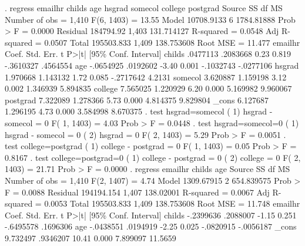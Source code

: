 . regress emailhr childs age hsgrad somecol college postgrad 
{\smallskip}
      Source {\VBAR}       SS           df       MS      Number of obs   =     1,410
   F(6, 1403)      =     13.55
       Model {\VBAR}  10708.9133         6  1784.81888   Prob > F        =    0.0000
    Residual {\VBAR}   184794.92     1,403  131.714127   R-squared       =    0.0548
   Adj R-squared   =    0.0507
       Total {\VBAR}  195503.833     1,409  138.753608   Root MSE        =    11.477
{\smallskip}
     emailhr {\VBAR}      Coef.   Std. Err.      t    P>|t|     [95\% Conf. Interval]
      childs {\VBAR}   .0477113   .2083668     0.23   0.819    -.3610327    .4564554
         age {\VBAR}  -.0654925   .0192602    -3.40   0.001    -.1032743   -.0277106
      hsgrad {\VBAR}   1.970668   1.143132     1.72   0.085    -.2717642      4.2131
     somecol {\VBAR}   3.620887   1.159198     3.12   0.002     1.346939    5.894835
     college {\VBAR}   7.565025   1.220929     6.20   0.000     5.169982    9.960067
    postgrad {\VBAR}   7.322089   1.278366     5.73   0.000     4.814375    9.829804
       _cons {\VBAR}   6.127687   1.296195     4.73   0.000     3.584998    8.670375
{\smallskip}
. test hsgrad=somecol
{\smallskip}
 ( 1)  hsgrad - somecol = 0
{\smallskip}
       F(  1,  1403) =    4.03
            Prob > F =    0.0448
{\smallskip}
. test hsgrad=somecol=0
{\smallskip}
 ( 1)  hsgrad - somecol = 0
 ( 2)  hsgrad = 0
{\smallskip}
       F(  2,  1403) =    5.29
            Prob > F =    0.0051
{\smallskip}
. test college=postgrad
{\smallskip}
 ( 1)  college - postgrad = 0
{\smallskip}
       F(  1,  1403) =    0.05
            Prob > F =    0.8167
{\smallskip}
. test college=postgrad=0 
{\smallskip}
 ( 1)  college - postgrad = 0
 ( 2)  college = 0
{\smallskip}
       F(  2,  1403) =   21.71
            Prob > F =    0.0000
{\smallskip}
. regress emailhr childs age  
{\smallskip}
      Source {\VBAR}       SS           df       MS      Number of obs   =     1,410
   F(2, 1407)      =      4.74
       Model {\VBAR}  1309.67915         2  654.839575   Prob > F        =    0.0088
    Residual {\VBAR}  194194.154     1,407   138.02001   R-squared       =    0.0067
   Adj R-squared   =    0.0053
       Total {\VBAR}  195503.833     1,409  138.753608   Root MSE        =    11.748
{\smallskip}
     emailhr {\VBAR}      Coef.   Std. Err.      t    P>|t|     [95\% Conf. Interval]
      childs {\VBAR}  -.2399636   .2088007    -1.15   0.251    -.6495578    .1696306
         age {\VBAR}  -.0438551   .0194919    -2.25   0.025    -.0820915   -.0056187
       _cons {\VBAR}   9.732497   .9346207    10.41   0.000     7.899097     11.5659
{\smallskip}
